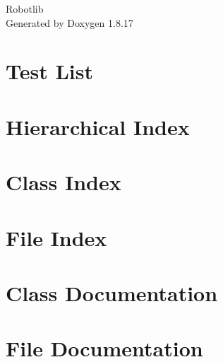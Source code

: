 \let\mypdfximage\pdfximage\def\pdfximage{\immediate\mypdfximage}\documentclass[twoside]{book}
\newcommand{\+}{\discretionary{\mbox{\scriptsize$\hookleftarrow$}}{}{}}
\newcommand{\clearemptydoublepage}{%
  \newpage{\pagestyle{empty}\cleardoublepage}%
}
\begin{document}
\hypersetup{pageanchor=false,
             bookmarksnumbered=true,
             pdfencoding=unicode
            }
\begin{titlepage}
\vspace*{7cm}
\begin{center}%
{\Large Robotlib }\\
\vspace*{1cm}
{\large Generated by Doxygen 1.8.17}\\
\end{center}
\end{titlepage}
\clearemptydoublepage
{}
\tableofcontents
\clearemptydoublepage
{}
\hypersetup{pageanchor=true}

\chapter{Test List}
\label{test}

\chapter{Hierarchical Index}

\chapter{Class Index}

\chapter{File Index}

\chapter{Class Documentation}

\chapter{File Documentation}



\backmatter
\newpage
{}
\clearemptydoublepage
{}
\printindex
\end{document}
